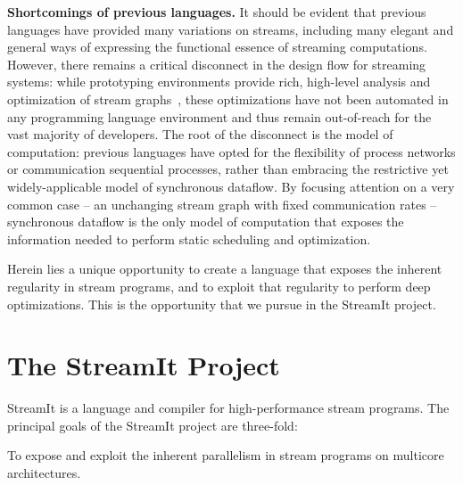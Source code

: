 {\bf Shortcomings of previous languages.}  It should be evident that
previous languages have provided many variations on streams, including
many elegant and general ways of expressing the functional essence of
streaming computations.  However, there remains a critical disconnect
in the design flow for streaming systems: while prototyping
environments provide rich, high-level analysis and optimization of
stream
graphs~\cite{bhattacharyya_optimal_1995,bhattacharyya_software_1996,bhattacharyya_self-timed_1996,ad_data_1997,zitzler_multidimensional_2000,murthy_shared_2001,govindarajan_minimizing_2002,murthy_buffer_2004,geilen_minimising_2005,stuijk_exploring_2006},
these optimizations have not been automated in any programming
language environment and thus remain out-of-reach for the vast
majority of developers.  The root of the disconnect is the model of
computation: previous languages have opted for the flexibility of
process networks or communication sequential processes, rather than
embracing the restrictive yet widely-applicable model of synchronous
dataflow.  By focusing attention on a very common case -- an
unchanging stream graph with fixed communication rates -- synchronous
dataflow is the only model of computation that exposes the information
needed to perform static scheduling and optimization.

Herein lies a unique opportunity to create a language that exposes the
inherent regularity in stream programs, and to exploit that regularity
to perform deep optimizations.  This is the opportunity that we pursue
in the StreamIt project.


\section{The StreamIt Project}

StreamIt is a language and compiler for high-performance stream
programs.  The principal goals of the StreamIt project are three-fold:

\mybegin

\item To expose and exploit the inherent parallelism in stream
  programs on multicore architectures.

